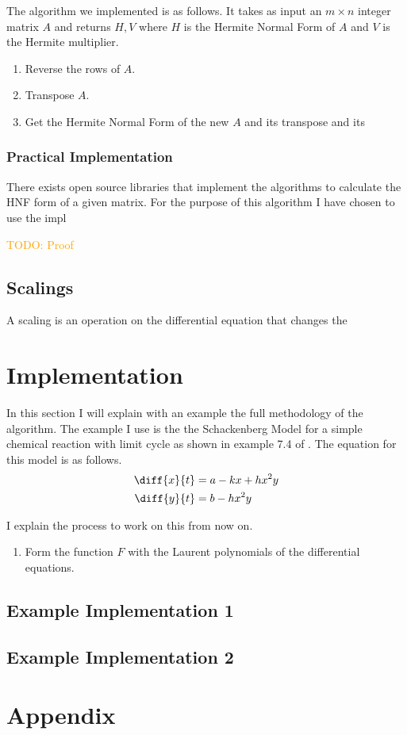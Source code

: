 \documentclass[oneside, a4paper, onecolumn, 11pt]{article}
\newcommand{\todo}[1]{
    \begin{mdframed}
        \textcolor{orange}{
        TODO: #1
        }
    \end{mdframed}
}
\begin{document}
The algorithm we implemented is as follows. It takes as input an \(m \times n\) integer matrix \(A\) and returns \(H, V\) where \(H\) is the Hermite Normal Form of \(A\) and \(V\) is the Hermite multiplier.
\begin{enumerate}
    \item Reverse the rows of \(A\).
    \item Transpose \(A\).
    \item Get the Hermite Normal Form of the new \(A\) and its transpose and its 
\end{enumerate}

\subsubsection{Practical Implementation}

There exists open source libraries that implement the algorithms to calculate the HNF form of a given matrix. For the purpose of this algorithm I have chosen to use the impl

\todo{Proof}


\subsection{Scalings}

A scaling is an operation on the differential equation that changes the

\section{Implementation}


In this section I will explain with an example the full methodology of the algorithm. The example I use is the the Schackenberg Model for a simple chemical reaction with limit cycle as shown in example 7.4 of \cite{Hubert2013}. The equation for this model is as follows.
\begin{align*}
    \diff{x}{t}
     & = a - kx + hx^2y \\
    \diff{y}{t}
     & = b - h x^2 y
\end{align*}

I explain the process to work on this from now on.

\begin{enumerate}[label=Step \arabic*:]
    \item Form the function \(F\) with the Laurent polynomials of the differential equations.
\end{enumerate}

\subsection{Example Implementation 1}

\subsection{Example Implementation 2}

\newpage



\newpage
\appendix

\section{Appendix}
\label{sec:appendix}
\end{document}
